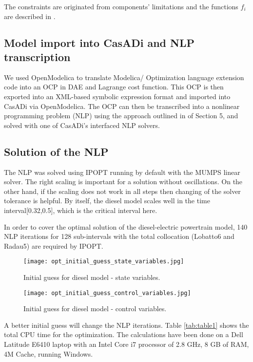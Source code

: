 The constraints are originated from components’ limitations and the functions $ f_i$ are described in \cite{sivertsson}.

\subsection{Model import into CasADi and NLP transcription}
\label{sec:optimizationxmlimport}

We used OpenModelica to translate Modelica/ Optimization
language extension code into an OCP in DAE and Lagrange
cost function. This OCP is then exported into an XML-based
symbolic expression format and imported into CasADi via
OpenModelica. The OCP can then be transcribed into a
nonlinear programming problem (NLP) using the approach
outlined in \cite{bernhard} of Section 5, and solved with one of CasADi’s interfaced NLP solvers.

\subsection{Solution of the NLP}
\label{sec:optimizationnlp}

The NLP was solved using IPOPT \cite{wachter} running by default with the MUMPS linear solver.
The right scaling is important for a solution without oscillations.
On the other hand, if the scaling does not work in all steps
then changing of the solver tolerance is helpful. By itself, the diesel model
scales well in the time interval[0.32,0.5],
which is the critical interval here.

In order to cover the optimal solution of the diesel-electric
powertrain model, 140 NLP iterations for 128 sub-intervals
with the total collocation (Lobatto6 and Radau5) are required by
IPOPT.

\begin{figure}
	\texttt{[image: opt\_initial\_guess\_state\_variables.jpg]}
	\caption{Initial guess for diesel model - state variables.}
	\label{fig:initialguessstatevariables}
\end{figure}

\begin{figure}
	\texttt{[image: opt\_initial\_guess\_control\_variables.jpg]}
	\caption{Initial guess for diesel model - control variables.}
	\label{fig:initialguesscontrolvariables}
\end{figure}


A better initial guess will change the NLP iterations.
Table \ref{tab:table1} shows the total CPU time for the optimization. The calculations have been done on a Dell Latitude E6410 laptop
with an Intel Core i7 processor of 2.8 GHz, 8 GB of RAM, 4M Cache, running Windows.

